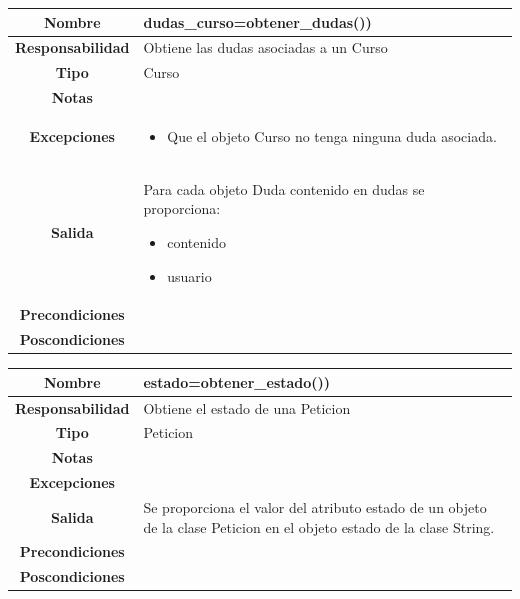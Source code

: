                        \begin{table}[!ht]
\begin{tabular}{|c|m{10cm}|}
\hline\rowcolor{Gray}
{\bf Nombre } & {dudas\_curso=obtener\_dudas())}\\
\hline
{\bf Responsabilidad } & {Obtiene las dudas asociadas a un Curso}\\
\hline
\rowcolor{Gray}
{\bf Tipo } & {Curso} \\
\hline
{\bf Notas } & { } \\
\hline
\rowcolor{Gray}
{\bf Excepciones }& {
	   	\begin{itemize}
	  \item Que el objeto Curso no tenga ninguna duda asociada.
	    \end{itemize}
} \\
\hline
{\bf Salida }& 
	  { Para cada objeto Duda contenido en dudas se proporciona:
	   	\begin{itemize}
	  \item contenido
	  \item usuario
	  	    \end{itemize}
} 
 \\
\hline
\rowcolor{Gray}
{\bf Precondiciones }& {
}\\
\hline
{\bf Poscondiciones }& { 
  }
  \\
\hline
\end{tabular}

\end{table}






                       \begin{table}[!ht]
\begin{tabular}{|c|m{10cm}|}
\hline\rowcolor{Gray}
{\bf Nombre } & {estado=obtener\_estado())}\\
\hline
{\bf Responsabilidad } & {Obtiene el estado de una Peticion}\\
\hline
\rowcolor{Gray}
{\bf Tipo } & {Peticion} \\
\hline
{\bf Notas } & { } \\
\hline
\rowcolor{Gray}
{\bf Excepciones }& {
} \\
\hline
{\bf Salida }& 
	  { Se proporciona el valor del atributo estado de un objeto de la clase Peticion  en el objeto estado de la clase String.
} 
 \\
\hline
\rowcolor{Gray}
{\bf Precondiciones }& {
}\\
\hline
{\bf Poscondiciones }& { 
  }
  \\
\hline
\end{tabular}

\end{table}



